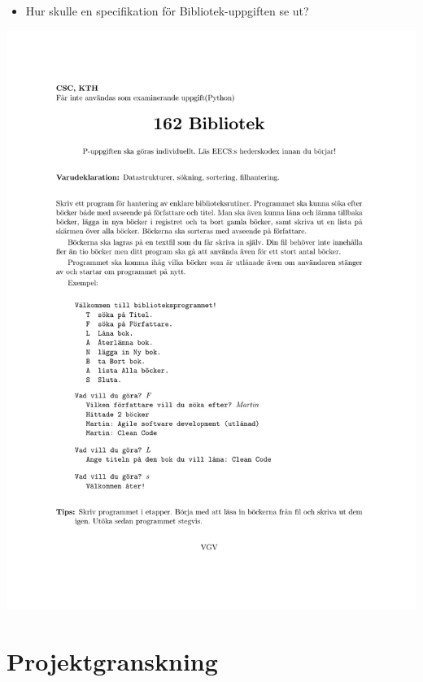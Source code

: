 \begin{frame}
  \begin{question}
    \begin{itemize}
      \item Hur skulle en specifikation för Bibliotek-uppgiften se ut?
    \end{itemize}
  \end{question}

  \includegraphics[width=\columnwidth]{exempel.pdf}
\end{frame}


\section{Projektgranskning}

